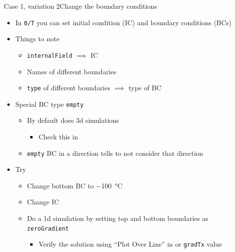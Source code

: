 \begin{frame}{Case 1, variation 2}{Change the boundary conditions}
    \begin{itemize}
        \setitemsep{1em}
        \item In \texttt{0/T} you can set initial condition (IC) and boundary conditions (BCs)
        \item Things to note
        \begin{itemize}
            \item \texttt{internalField} $\implies$ IC
            \item Names of different boundaries
            \item \texttt{type} of different boundaries $\implies$ type of BC
        \end{itemize}
        \item Special BC type \texttt{empty}
        \begin{itemize}
            \item By default \openfoam{} does 3d simulations
            \begin{itemize}
                \item Check this in \paraview
            \end{itemize}
            \item \texttt{empty} BC in a direction tells \openfoam{} to not consider that direction
        \end{itemize}
        \item Try
        \begin{itemize}
            \item Change bottom BC to \qty{-100}{\degreeCelsius}
            \item Change IC
            \item Do a 1d simulation by setting top and bottom boundaries as \texttt{zeroGradient}
            \begin{itemize}
                \item Verify the solution using ``Plot Over Line'' in \paraview{} or \texttt{gradTx} value
            \end{itemize}
        \end{itemize}
    \end{itemize}
\end{frame}

